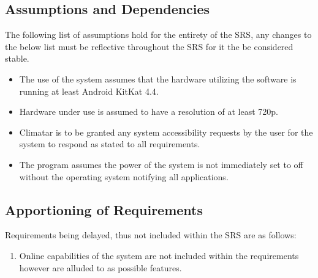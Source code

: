 \documentclass[]{article}
\begin{document}
\subsection{Assumptions and Dependencies}
\label{sub:assumptions_and_dependencies}
The following list of assumptions hold for the entirety of the SRS, any changes to the below list must be reflective throughout the SRS for it the be considered stable.
\begin{itemize}
	\item The use of the system assumes that the hardware utilizing the software is running at least Android KitKat 4.4.
	\item Hardware under use is assumed to have a resolution of at least 720p.
	\item Climatar is to be granted any system accessibility requests by the user for the system to respond as stated to all requirements.
	\item The program assumes the power of the system is not immediately set to off without the operating system notifying all applications.
\end{itemize}

\subsection{Apportioning of Requirements}
\label{sub:apportioning_of_requirements}
Requirements being delayed, thus not included within the SRS are as follows:
\begin{enumerate}
	\item Online capabilities of the system are not included within the requirements however are alluded to as possible features.
\end{enumerate}

\end{document}
